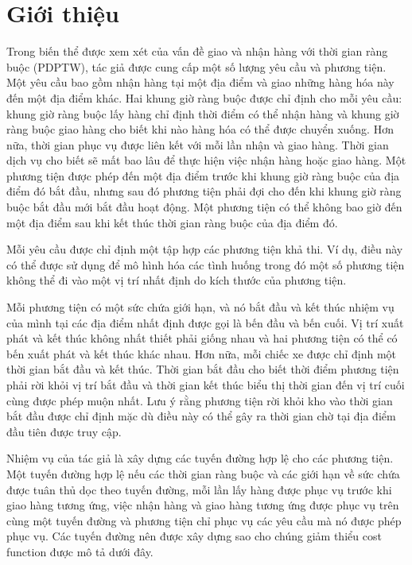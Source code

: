 \chapter*{Giới thiệu}
Trong biến thể được xem xét của vấn đề giao và nhận hàng với thời gian ràng buộc (PDPTW), tác giả được cung cấp một số lượng yêu cầu và phương tiện. Một yêu cầu bao gồm nhận hàng tại một địa điểm và giao những hàng hóa này đến một địa điểm khác. Hai khung giờ ràng buộc được chỉ định cho mỗi yêu cầu: khung giờ ràng buộc lấy hàng chỉ định thời điểm có thể nhận hàng và khung giờ ràng buộc giao hàng cho biết khi nào hàng hóa có thể được chuyển xuống. Hơn nữa, thời gian phục vụ được liên kết với mỗi lần nhận và giao hàng. Thời gian dịch vụ cho biết sẽ mất bao lâu để thực hiện việc nhận hàng hoặc giao hàng. Một phương tiện được phép đến một địa điểm trước khi khung giờ ràng buộc của địa điểm đó bắt đầu, nhưng sau đó phương tiện phải đợi cho đến khi khung giờ ràng buộc bắt đầu mới bắt đầu hoạt động. Một phương tiện có thể không bao giờ đến một địa điểm sau khi kết thúc thời gian ràng buộc của địa điểm đó.

Mỗi yêu cầu được chỉ định một tập hợp các phương tiện khả thi. Ví dụ, điều này có thể được sử dụng để mô hình hóa các tình huống trong đó một số phương tiện không thể đi vào một vị trí nhất định do kích thước của phương tiện.

Mỗi phương tiện có một sức chứa giới hạn, và nó bắt đầu và kết thúc nhiệm vụ của mình tại các địa điểm nhất định được gọi là bến đầu và bến cuối. Vị trí xuất phát và kết thúc không nhất thiết phải giống nhau và hai phương tiện có thể có bến xuất phát và kết thúc khác nhau.
Hơn nữa, mỗi chiếc xe được chỉ định một thời gian bắt đầu và kết thúc. Thời gian bắt đầu cho biết thời điểm phương tiện phải rời khỏi vị trí bắt đầu và thời gian kết thúc biểu thị thời gian đến vị trí cuối cùng được phép muộn nhất. Lưu ý rằng phương tiện rời khỏi kho vào thời gian bắt đầu được chỉ định mặc dù điều này có thể gây ra thời gian chờ tại địa điểm đầu tiên được truy cập.

Nhiệm vụ của tác giả là xây dựng các tuyến đường hợp lệ cho các phương tiện. Một tuyến đường hợp lệ nếu các thời gian ràng buộc và các giới hạn về sức chứa được tuân thủ dọc theo tuyến đường, mỗi lần lấy hàng được phục vụ trước khi giao hàng tương ứng, việc nhận hàng và giao hàng tương ứng được phục vụ trên cùng một tuyến đường và phương tiện chỉ phục vụ các yêu cầu mà nó được phép phục vụ. Các tuyến đường nên được xây dựng sao cho chúng giảm thiểu cost function được mô tả dưới đây.

